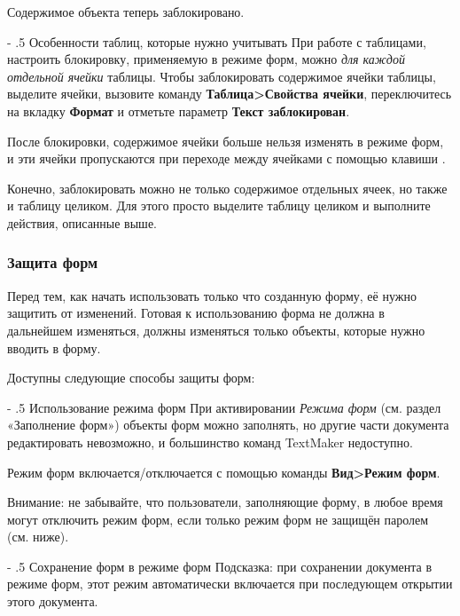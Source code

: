 ﻿\documentclass[a4paper,10pt]{article}
\makeatletter
\renewcommand\paragraph{%
   \@startsection{paragraph}{4}{0mm}%
      {-\baselineskip}%
      {.5\baselineskip}%
      {\normalfont\normalsize\bfseries}}
\makeatother
\begin{document}
Содержимое объекта теперь заблокировано.

\paragraph{Особенности таблиц, которые нужно учитывать}
При работе с таблицами, настроить блокировку, применяемую в режиме форм, можно \textit{для каждой отдельной ячейки} таблицы. Чтобы заблокировать содержимое ячейки таблицы, выделите ячейки, вызовите команду \textbf{Таблица>Свойства ячейки}, переключитесь на вкладку \textbf{Формат} и отметьте параметр \textbf{Текст заблокирован}.

После блокировки, содержимое ячейки больше нельзя изменять в режиме форм, и эти ячейки пропускаются при переходе между ячейками с помощью клавиши .

Конечно, заблокировать можно не только содержимое отдельных ячеек, но также и таблицу целиком. Для этого просто выделите таблицу целиком и выполните действия, описанные выше.

\subsubsection{Защита форм}
Перед тем, как начать использовать только что созданную форму, её нужно защитить от изменений. Готовая к использованию форма не должна в дальнейшем изменяться, должны изменяться только объекты, которые нужно вводить в форму.

Доступны следующие способы защиты форм:

\paragraph{Использование режима форм}
При активировании \textit{Режима форм} (см. раздел «Заполнение форм») объекты форм можно заполнять, но другие части документа редактировать невозможно, и большинство команд TextMaker недоступно.

Режим форм включается/отключается с помощью команды \textbf{Вид>Режим форм}.

Внимание: не забывайте, что пользователи, заполняющие форму, в любое время могут отключить режим форм, если только режим форм не защищён паролем (см. ниже).

\paragraph{Сохранение форм в режиме форм}
Подсказка: при сохранении документа в режиме форм, этот режим автоматически  включается при последующем открытии этого документа.
\end{document}
